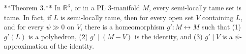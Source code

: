 **Theorem 3.** In $\mathbb{R}^3$, or in a PL 3-manifold $M$, every semi-locally tame set is tame. In fact, if $L$ is semi-locally tame, then for every open set $V$ containing $L$, and for every $\psi \gg 0$ on $V$, there is a homeomorphism $g': M \leftrightarrow M$ such that (1) $g'(L)$ is a polyhedron, (2) $g' \mid (M-V)$ is the identity, and (3) $g' \mid V$ is a $\psi$-approximation of the identity.
